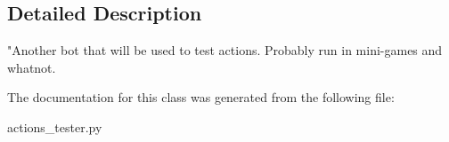 \subsection{Detailed Description}
\begin{DoxyVerb}"Another bot that will be used to test actions. Probably run in mini-games and whatnot.\end{DoxyVerb}
 

The documentation for this class was generated from the following file\+:\begin{DoxyCompactItemize}
\item 
actions\+\_\+tester.\+py\end{DoxyCompactItemize}
